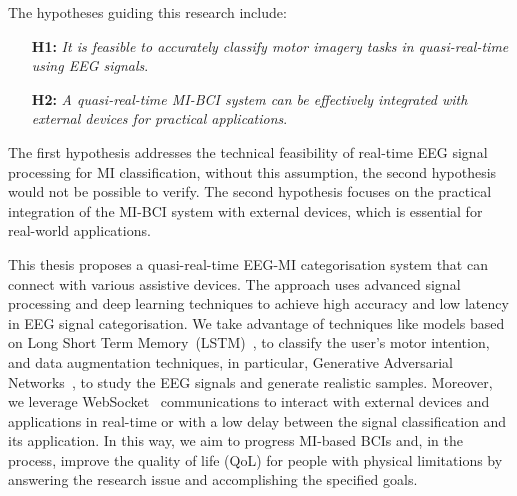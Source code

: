 The hypotheses guiding this research include:
\begin{itemize}
    \item[\textbf{H1:}] \emph{It is feasible to accurately classify motor imagery tasks in quasi-real-time using EEG signals}.
    \item[\textbf{H2:}] \emph{A quasi-real-time MI-BCI system can be effectively integrated with external devices for practical applications}.
\end{itemize}

The first hypothesis addresses the technical feasibility of real-time EEG signal processing for MI classification, without this assumption, the second hypothesis would not be possible to verify.
The second hypothesis focuses on the practical integration of the MI-BCI system with external devices, which is essential for real-world applications.

This thesis proposes a quasi-real-time EEG-MI categorisation system that can connect with various assistive devices.
The approach uses advanced signal processing and deep learning techniques to achieve high accuracy and low latency in EEG signal categorisation. 
We take advantage of techniques like models based on Long Short Term Memory~(LSTM)~\cite{hochreiter1997long}, to classify the user's motor intention, and data augmentation techniques, in particular, Generative Adversarial Networks~\cite{goodfellow2014generative}, to study the EEG signals and generate realistic samples.
Moreover, we leverage WebSocket~\cite{fette2011rfc} communications to interact with external devices and applications in real-time or with a low delay between the signal classification and its application.
In this way, we aim to progress MI-based BCIs and, in the process, improve the quality of life (QoL) for people with physical limitations by answering the research issue and accomplishing the specified goals.


